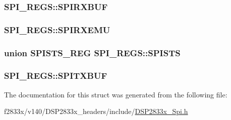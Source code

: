 \subsubsection[{S\+P\+I\+R\+X\+B\+U\+F}]{ S\+P\+I\+\_\+\+R\+E\+G\+S\+::\+S\+P\+I\+R\+X\+B\+U\+F}\label{struct_s_p_i___r_e_g_s_a6e3c4fed627563bea02693fa31083f1e}
\hypertarget{struct_s_p_i___r_e_g_s_a2ea20c8abc17c63ec2dc52fe60c547db}{}
\subsubsection[{S\+P\+I\+R\+X\+E\+M\+U}]{ S\+P\+I\+\_\+\+R\+E\+G\+S\+::\+S\+P\+I\+R\+X\+E\+M\+U}\label{struct_s_p_i___r_e_g_s_a2ea20c8abc17c63ec2dc52fe60c547db}
\hypertarget{struct_s_p_i___r_e_g_s_a84471d291e5106600bd4d397af42fe98}{}
\subsubsection[{S\+P\+I\+S\+T\+S}]{\setlength{\rightskip}{0pt plus 5cm}union {\bf S\+P\+I\+S\+T\+S\+\_\+\+R\+E\+G} S\+P\+I\+\_\+\+R\+E\+G\+S\+::\+S\+P\+I\+S\+T\+S}\label{struct_s_p_i___r_e_g_s_a84471d291e5106600bd4d397af42fe98}
\hypertarget{struct_s_p_i___r_e_g_s_a98ae19da5d7e129158cce4d40783a20a}{}
\subsubsection[{S\+P\+I\+T\+X\+B\+U\+F}]{ S\+P\+I\+\_\+\+R\+E\+G\+S\+::\+S\+P\+I\+T\+X\+B\+U\+F}\label{struct_s_p_i___r_e_g_s_a98ae19da5d7e129158cce4d40783a20a}


The documentation for this struct was generated from the following file\+:\begin{DoxyCompactItemize}
\item 
f2833x/v140/\+D\+S\+P2833x\+\_\+headers/include/\hyperlink{_d_s_p2833x___spi_8h}{D\+S\+P2833x\+\_\+\+Spi.\+h}\end{DoxyCompactItemize}
